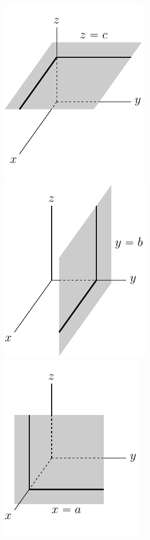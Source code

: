 \begin{efig}
\begin{center}
   \includegraphics[scale=0.75]{xyplaneN.pdf}\qquad
   \includegraphics[scale=0.75]{xzplaneN.pdf}\qquad
   \includegraphics[scale=0.75]{yzplaneN.pdf}
\end{center}
\end{efig}
